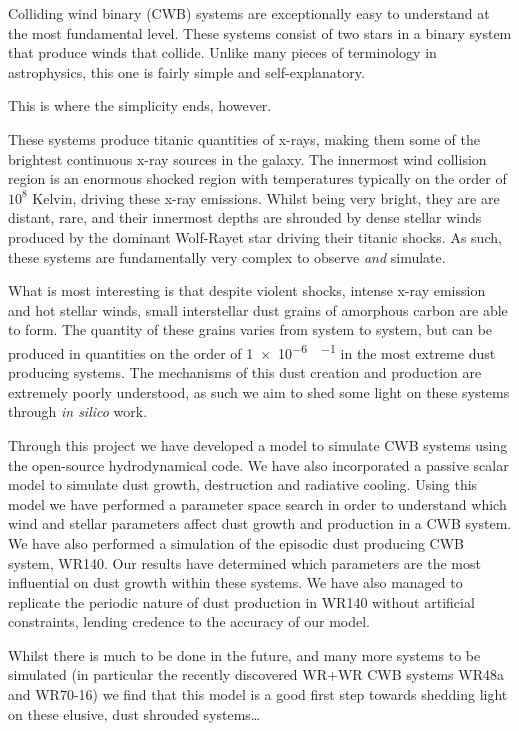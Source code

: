 


\begin{abstracts}        %

\setlength{\parindent}{17.62482pt}
\setlength{\parskip}{0.0pt plus 1.0pt}

Colliding wind binary (CWB) systems are exceptionally easy to understand at the most fundamental level.
These systems consist of two stars in a binary system that produce winds that collide.
Unlike many pieces of terminology in astrophysics, this one is fairly simple and self-explanatory.

\begin{center}
  This is where the simplicity ends, however.
\end{center}

These systems produce titanic quantities of x-rays, making them some of the brightest continuous x-ray sources in the galaxy.
The innermost wind collision region is an enormous shocked region with temperatures typically on the order of $10^8$ Kelvin, driving these x-ray emissions.
Whilst being very bright, they are are distant, rare, and their innermost depths are shrouded by dense stellar winds produced by the dominant Wolf-Rayet star driving their titanic shocks.
As such, these systems are fundamentally very complex to observe \emph{and} simulate.

What is most interesting is that despite violent shocks, intense x-ray emission and hot stellar winds, small interstellar dust grains of amorphous carbon are able to form.
The quantity of these grains varies from system to system, but can be produced in quantities on the order of \SI{1e-6}{\solarmass\per\year} in the most extreme dust producing systems.
The mechanisms of this dust creation and production are extremely poorly understood, as such we aim to shed some light on these systems through \emph{in silico} work.

Through this project we have developed a model to simulate CWB systems using the open-source \athena{} hydrodynamical code.
We have also incorporated a passive scalar model to simulate dust growth, destruction and radiative cooling.
Using this model we have performed a parameter space search in order to understand which wind and stellar parameters affect dust growth and production in a CWB system.
We have also performed a simulation of the episodic dust producing CWB system, WR140.
Our results have determined which parameters are the most influential on dust growth within these systems.
We have also managed to replicate the periodic nature of dust production in WR140 without artificial constraints, lending credence to the accuracy of our model.

Whilst there is much to be done in the future, and many more systems to be simulated (in particular the recently discovered WR+WR CWB systems WR48a and WR70-16) we find that this model is a good first step towards shedding light on these elusive, dust shrouded systems\ldots
	
\end{abstracts}


